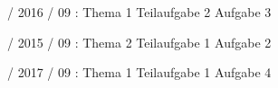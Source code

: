 \documentclass{lehramt-informatik}
\begin{document}
%

 / 2016 / 09 : Thema 1 Teilaufgabe 2 Aufgabe 3

%

 / 2015 / 09 : Thema 2 Teilaufgabe 1 Aufgabe 2

%

 / 2017 / 09 : Thema 1 Teilaufgabe 1 Aufgabe 4

\literatur
\end{document}
